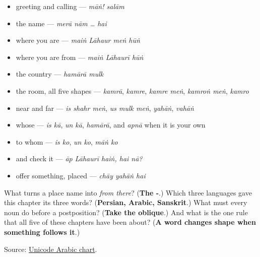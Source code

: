 \begin{itemize}
\raggedright
  \item greeting and calling — \emph{māṅ! salām}
  \item the name — \emph{merā nām … hai}
  \item where you are — \emph{maiṅ Lāhaur meṅ hūṅ}
  \item where you are from — \emph{maiṅ Lāhaurī hūṅ}
  \item the country — \emph{hamārā mulk}
  \item the room, all five shapes — \emph{kamrā}, \emph{kamre}, \emph{kamre meṅ}, \emph{kamroṅ meṅ}, \emph{kamro}
  \item near and far — \emph{is shahr meṅ}, \emph{us mulk meṅ}, \emph{yahāṅ}, \emph{vahāṅ}
  \item whose — \emph{is kā}, \emph{un kā}, \emph{hamārā}, and \emph{apnā} when it is your own
  \item to whom — \emph{is ko}, \emph{un ko}, \emph{māṅ ko}
  \item and check it — \emph{āp Lāhaurī haiṅ, hai nā?}
  \item offer something, placed — \emph{chāy yahāṅ hai}
\end{itemize}

\begin{tcolorbox}[breakable,colback=teal!4,colframe=teal!35!black,title={Before you move on}]
What turns a place name into \emph{from there}? (\textbf{The -}.) Which three languages gave this chapter its three words? (\textbf{Persian, Arabic, Sanskrit}.) What must every noun do before a postposition? (\textbf{Take the oblique}.) And what is the one rule that all five of these chapters have been about? (\textbf{A word changes shape when something follows it}.)

Source: \href{https://www.unicode.org/charts/PDF/U0600.pdf}{Unicode Arabic chart}.
\end{tcolorbox}
